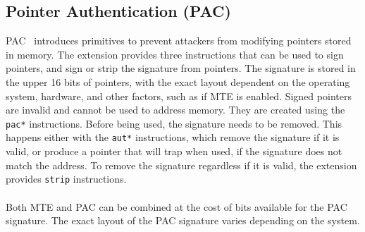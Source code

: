 \subsection{Pointer Authentication (PAC)}
\label{subsec:pac}

\Ac{PAC}~\cite{Qualcomm2017PointerAuth} introduces primitives to prevent attackers from modifying pointers stored in memory.
The extension provides three instructions that can be used to sign pointers, and sign or strip the signature from pointers.
The signature is stored in the upper 16 bits of pointers, with the exact layout dependent on the operating system, hardware, and other factors, such as if MTE is enabled.
Signed pointers are invalid and cannot be used to address memory.
They are created using the \texttt{pac*} instructions.
Before being used, the signature needs to be removed.
This happens either with the \texttt{aut*} instructions, which remove the signature if it is valid, or produce a pointer that will trap when used, if the signature does not match the address.
To remove the signature regardless if it is valid, the extension provides \texttt{strip} instructions.

\paragraph{} Both MTE and PAC can be combined at the cost of bits available for the PAC signature.
The exact layout of the PAC signature varies depending on the system.


